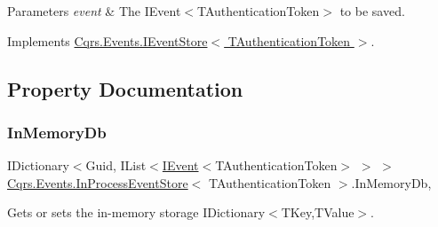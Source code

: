 \begin{DoxyParams}{Parameters}
{\em event} & The I\+Event$<$\+T\+Authentication\+Token$>$ to be saved.\\
\hline
\end{DoxyParams}


Implements \hyperlink{interfaceCqrs_1_1Events_1_1IEventStore_a92e768243d6602d09b786bbd06811ce6_a92e768243d6602d09b786bbd06811ce6}{Cqrs.\+Events.\+I\+Event\+Store$<$ T\+Authentication\+Token $>$}.



\subsection{Property Documentation}
\mbox{\label{classCqrs_1_1Events_1_1InProcessEventStore_a4d0dee81baa7348a2d16fd0878220bd4_a4d0dee81baa7348a2d16fd0878220bd4}} 
\subsubsection{\texorpdfstring{In\+Memory\+Db}{InMemoryDb}}
{\footnotesize\ttfamily I\+Dictionary$<$Guid, I\+List$<$\hyperlink{interfaceCqrs_1_1Events_1_1IEvent}{I\+Event}$<$T\+Authentication\+Token$>$ $>$ $>$ \hyperlink{classCqrs_1_1Events_1_1InProcessEventStore}{Cqrs.\+Events.\+In\+Process\+Event\+Store}$<$ T\+Authentication\+Token $>$.In\+Memory\+Db\hspace{0.3cm}{\ttfamily [get]}, {\ttfamily [protected]}}



Gets or sets the in-\/memory storage I\+Dictionary$<$\+T\+Key,\+T\+Value$>$. 

